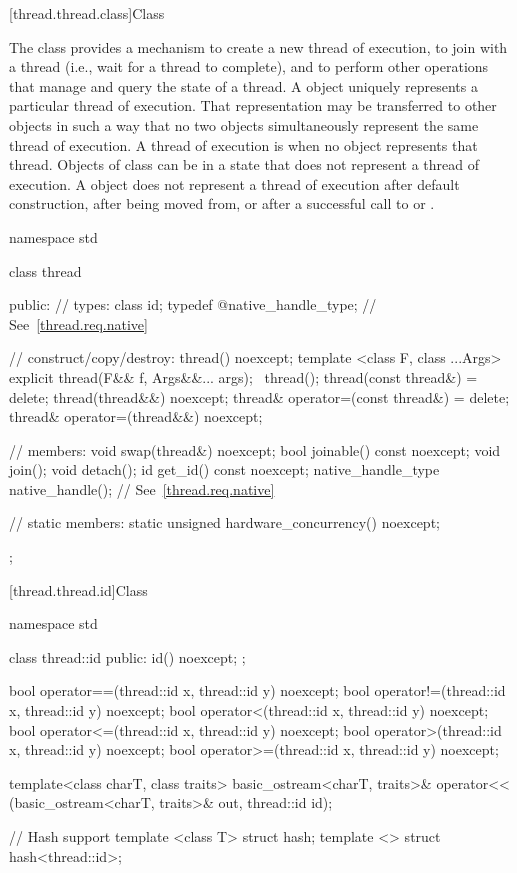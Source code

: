 [thread.thread.class]{Class }

\pnum
The class  provides a mechanism to create a new thread of execution, to join with
a thread (i.e., wait for a thread to complete), and to perform other operations that manage and
query the state of a thread. A  object uniquely represents a particular thread of
execution. That representation may be transferred to other  objects in such a way
that no two  objects simultaneously represent the same thread of execution. A
thread of execution is  when no  object represents that thread.
Objects of class  can be in a state that does not represent a thread of
execution. \enternote A  object does not represent a thread of execution after
default construction, after being moved from, or after a successful call to  or
. \exitnote

\begin{codeblock}
namespace std {
  class thread {
  public:
    // types:
    class id;
    typedef @\impdef@ native_handle_type; // See~\ref{thread.req.native}

    // construct/copy/destroy:
    thread() noexcept;
    template <class F, class ...Args> explicit thread(F&& f, Args&&... args);
    ~thread();
    thread(const thread&) = delete;
    thread(thread&&) noexcept;
    thread& operator=(const thread&) = delete;
    thread& operator=(thread&&) noexcept;

    // members:
    void swap(thread&) noexcept;
    bool joinable() const noexcept;
    void join();
    void detach();
    id get_id() const noexcept;
    native_handle_type native_handle(); // See~\ref{thread.req.native}

    // static members:
    static unsigned hardware_concurrency() noexcept;
  };
}
\end{codeblock}

[thread.thread.id]{Class }

\begin{codeblock}
namespace std {
  class thread::id {
  public:
      id() noexcept;
  };

  bool operator==(thread::id x, thread::id y) noexcept;
  bool operator!=(thread::id x, thread::id y) noexcept;
  bool operator<(thread::id x, thread::id y) noexcept;
  bool operator<=(thread::id x, thread::id y) noexcept;
  bool operator>(thread::id x, thread::id y) noexcept;
  bool operator>=(thread::id x, thread::id y) noexcept;

  template<class charT, class traits>
    basic_ostream<charT, traits>&
      operator<< (basic_ostream<charT, traits>& out, thread::id id);

  // Hash support
  template <class T> struct hash;
  template <> struct hash<thread::id>;
}
\end{codeblock}

